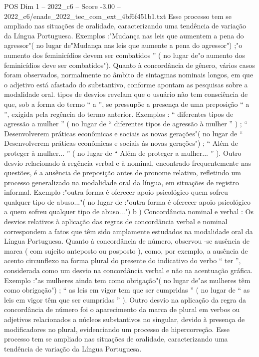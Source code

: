 \begin{textsample}{POS Dim 1 – 2022\_c6 – Score -3.00 – 2022\_c6/enade\_2022\_tec\_com\_ext\_4bf6f451b1.txt}
Esse processo tem se ampliado nas situações de oralidade, caracterizando uma tendência de variação da Língua Portuguesa.
Exemplos :"Mudança nas leis que aumentem a pena do agressor"( no lugar de"Mudança nas leis que aumente a pena do agressor") ;"o aumento dos feminicídios devem ser combatidos ” ( no lugar de"o aumento dos feminicídios deve ser combatidos").
Quanto à concordância de gênero, vários casos foram observados, normalmente no âmbito de sintagmas nominais longos, em que o adjetivo está afastado do substantivo, conforme apontam as pesquisas sobre a modalidade oral. tipos de desvios revelam que o usuário não tem consciência de que, sob a forma do termo “ a ”, se pressupõe a presença de uma preposição “ a ”, exigida pela regência do termo anterior.
Exemplos : “ diferentes tipos de agressão a mulher ” ( no lugar de “ diferentes tipos de agressão à mulher ” ) ; “ Desenvolverem práticas econômicas e sociais as novas gerações"( no lugar de “ Desenvolverem práticas econômicas e sociais às novas gerações") ; “ Além de proteger à mulher... ” ( no lugar de “ Além de proteger a mulher... ” ).
Outro desvio relacionado à regência verbal e à nominal, encontrado frequentemente nas questões, é a ausência de preposição antes de pronome relativo, refletindo um processo generalizado na modalidade oral da língua, em situações de registro informal.
Exemplo :"outra forma é oferecer apoio psicológico quem sofreu qualquer tipo de abuso..."( no lugar de :"outra forma é oferecer apoio psicológico a quem sofreu qualquer tipo de abuso...") b ) Concordância nominal e verbal : Os desvios relativos à aplicação das regras de concordância verbal e nominal correspondem a fatos que têm sido amplamente estudados na modalidade oral da Língua Portuguesa.
Quanto à concordância de número, observou -se ausência de marca ( com sujeito anteposto ou posposto ), como, por exemplo, a ausência de acento circunflexo na forma plural do presente do indicativo do verbo “ ter ”, considerada como um desvio na concordância verbal e não na acentuação gráfica.
Exemplo :"as mulheres ainda tem como obrigação"( no lugar de"as mulheres têm como obrigação") ; “ as leis em vigor tem que ser cumpridas ” ( no lugar de “ as leis em vigor têm que ser cumpridas ” ).
Outro desvio na aplicação da regra da concordância de número foi o aparecimento da marca de plural em verbos ou adjetivos relacionados a núcleos substantivos no singular, devido à presença de modificadores no plural, evidenciando um processo de hipercorreção.
Esse processo tem se ampliado nas situações de oralidade, caracterizando uma tendência de variação da Língua Portuguesa.

\end{textsample}
